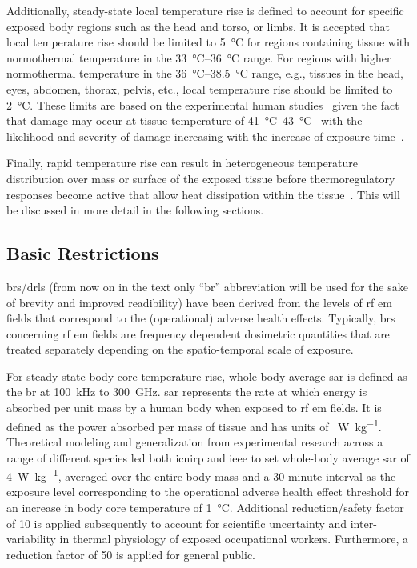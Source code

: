 Additionally, steady-state local temperature rise is defined to account for specific exposed body regions such as the head and torso, or limbs.
It is accepted that local temperature rise should be limited to \SI{5}{\celsius} for regions  containing tissue with normothermal temperature in the \SIrange[range-units=single,range-phrase=--]{33}{36}{\celsius} range.
For regions with higher normothermal temperature in the \SIrange[range-units=single,range-phrase=--]{36}{38.5}{\celsius} range, e.g., tissues in the head, eyes, abdomen, thorax, pelvis, etc., local temperature rise should be limited to \SI{2}{\celsius}.
These limits are based on the experimental human studies~\cite{Walters2000Heating} given the fact that damage may occur at tissue temperature of \SIrange[range-units=single,range-phrase=--]{41}{43}{\celsius}~\cite{Dewhirst2003Basic} with the likelihood and severity of damage increasing with the increase of exposure time~\cite{ICNIRP2020Guidelines}.

Finally, rapid temperature rise can result in heterogeneous temperature distribution over mass or surface of the exposed tissue before thermoregulatory responses become active that allow heat dissipation within the tissue~\cite{Foster2016Thermal,Foster2017Thermal,Laakso2017Human,Kodera2018Brief}. This will be discussed in more detail in the following sections.

\subsection{Basic Restrictions}
\Gls{br}s/\gls{drl}s (from now on in the text only ``\gls{br}'' abbreviation will be used for the sake of brevity and improved readibility) have been derived from the levels of \gls{rf} \gls{em} fields that correspond to the (operational) adverse health effects.
Typically, \gls{br}s concerning \gls{rf} \gls{em} fields are frequency dependent dosimetric quantities that are treated separately depending on the spatio-temporal scale of exposure.

For steady-state body core temperature rise, whole-body average \gls{sar} is defined as the \gls{br} at \SI{100}{\kHz} to \SI{300}{\GHz}.
\Gls{sar} represents the rate at which energy is absorbed per unit mass by a human body when exposed to \gls{rf} \gls{em} fields.
It is defined as the power absorbed per mass of tissue and has units of \SI{}{\watt\per\kg}.
Theoretical modeling and generalization from experimental research across a range of different species led both \gls{icnirp} and \gls{ieee} to set whole-body average \gls{sar} of \SI{4}{\watt\per\kg}, averaged over the entire body mass and a 30-minute interval as the exposure level corresponding to the operational adverse health effect threshold for an increase in body core temperature of \SI{1}{\celsius}.
Additional reduction/safety factor of 10 is applied subsequently to account for scientific uncertainty and inter-variability in thermal physiology of exposed occupational workers.
Furthermore, a reduction factor of 50 is applied for general public.

